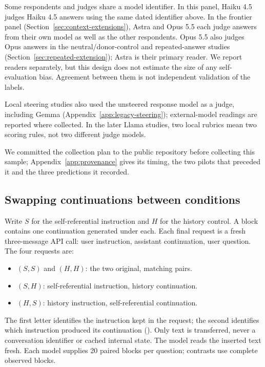 \documentclass[11pt]{article}
\begin{document}
Some respondents and judges share a model identifier. In this panel,
Haiku 4.5 judges Haiku 4.5 answers using the same dated identifier above.
In the frontier panel (Section~\ref{sec:context-extensions}), Astra and
Opus 5.5 each judge answers from their own model as well as the other
respondents. Opus 5.5 also judges Opus answers in the neutral/donor-control
and repeated-answer studies (Section~\ref{sec:repeated-extension});
Astra is their primary reader.
We report readers separately, but this design does not estimate the size
of any self-evaluation bias. Agreement between them is not independent
validation of the labels.

Local steering studies also used the unsteered response model as a judge,
including Gemma (Appendix~\ref{app:legacy-steering}); external-model readings
are reported where collected. In the later Llama studies, two local rubrics
mean two scoring rules, not two different judge models.

We committed the collection plan to the public repository before collecting
this sample; Appendix~\ref{app:provenance} gives its timing, the two pilots
that preceded it and the three predictions it recorded.

\subsection{Swapping continuations between conditions}
\label{sec:crossing}

Write $S$ for the self-referential instruction and $H$ for the history
control. A block contains one continuation generated under each. Each
final request is a fresh three-message API call: user instruction,
assistant continuation, user question. The four requests are:
\begin{itemize}
\item $(S,S)$ and $(H,H)$: the two original, matching pairs.
\item $(S,H)$: self-referential instruction, history continuation.
\item $(H,S)$: history instruction, self-referential continuation.
\end{itemize}
The first letter identifies the instruction kept in the request; the
second identifies which instruction produced its continuation
(). Only text is transferred, never a conversation
identifier or cached internal state. The model reads the inserted text
fresh. Each model supplies 20 paired blocks per question; contrasts use
complete observed blocks.
\end{document}
